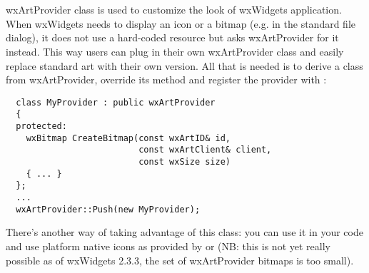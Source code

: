 %
%

\section{}\label{wxartprovider}

wxArtProvider class is used to customize the look of wxWidgets application.
When wxWidgets needs to display an icon or a bitmap (e.g. in the standard file
dialog), it does not use a hard-coded resource but asks wxArtProvider for it
instead. This way users can plug in their own wxArtProvider class and easily
replace standard art with their own version. All
that is needed is to derive a class from wxArtProvider, override its
 method and register the
provider with
:

\begin{verbatim}
  class MyProvider : public wxArtProvider
  {
  protected:
    wxBitmap CreateBitmap(const wxArtID& id, 
                          const wxArtClient& client,
                          const wxSize size)
    { ... }
  };
  ...
  wxArtProvider::Push(new MyProvider);
\end{verbatim}

There's another way of taking advantage of this class: you can use it in your code and use
platform native icons as provided by  or 
 (NB: this is not yet really
possible as of wxWidgets 2.3.3, the set of wxArtProvider bitmaps is too
small). 


\label{artprovideridentifying}

